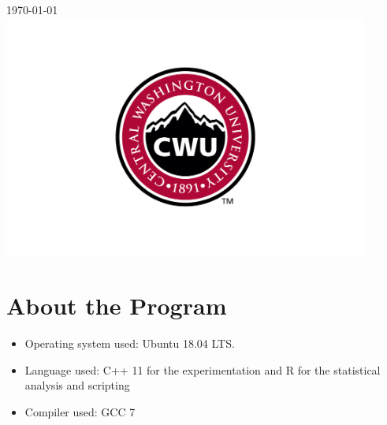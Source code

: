 \documentclass[12pt]{article}
\begin{document}
\begin{titlepage}
		
		
		{\large \today}\\ %
		
		
		\includegraphics[width=12cm]{CWU-Logo.png}\\[.5cm] %
		
		
		\vfill %
		
	\end{titlepage}
	\newpage
	\tableofcontents
	\newpage
	
	
	
	\section{About the Program}
	\begin{itemize}
		\item Operating system used: Ubuntu 18.04 LTS.
		\item Language used: C++ 11 for the experimentation and R for the statistical analysis and scripting 
		\item Compiler used: GCC 7
		
	\end{itemize}
\end{document}
